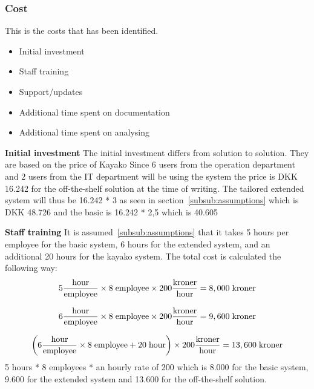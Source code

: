\subsubsection{Cost}
This is the costs that has been identified.
\begin{itemize}
\item Initial investment
\item Staff training
\item Support/updates
\item Additional time spent on documentation
\item Additional time spent on analysing
\end{itemize}

\textbf{Initial investment}
The initial investment differs from solution to solution. They are based on the price of Kayako\cite{webpage008} Since 6 users from the operation\cite{gert014} department and 2 users from the IT department\cite{lahib003} will be using the system the price is DKK 16.242 for the off-the-shelf solution at the time of writing. The tailored extended system will thus be 16.242 * 3 as seen in section~\ref{subsub:assumptions} which is DKK 48.726 and the basic is 16.242 * 2,5 which is 40.605

\textbf{Staff training}
It is assumed~\ref{subsub:assumptions} that it takes 5 hours per employee for the basic system, 6 hours for the extended system, and an additional 20 hours for the kayako system. The total cost is calculated the following way:
\[ 5 \frac{\mathrm{hour}}{\mathrm{employee}} \times 8 \hspace{1mm} \mathrm{employee} \times 200 \frac{\mathrm{kroner}}{\mathrm{hour}} = 8,000 \hspace{1mm} \mathrm{kroner} \]

\[ 6 \frac{\mathrm{hour}}{\mathrm{employee}} \times 8 \hspace{1mm} \mathrm{employee} \times 200 \frac{\mathrm{kroner}}{\mathrm{hour}} = 9,600 \hspace{1mm} \mathrm{kroner} \]

\[ \left( 6 \frac{\mathrm{hour}}{\mathrm{employee}} \times 8 \hspace{1mm} \mathrm{employee} + 20 \hspace{1mm} \mathrm{hour} \right) \times 200 \frac{\mathrm{kroner}}{\mathrm{hour}} = 13,600 \hspace{1mm} \mathrm{kroner} \]
5 hours * 8 employees * an hourly rate of 200 which is 8.000 for the basic system, 9.600 for the extended system and 13.600 for the off-the-shelf solution.

